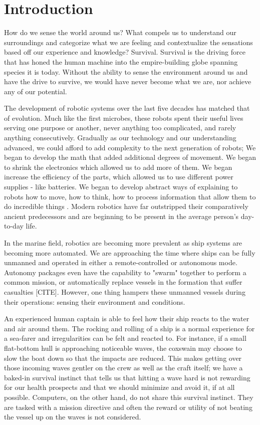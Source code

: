 \chapter{Introduction}\label{chap:intro}
How do we sense the world around us?
What compels us to understand our surroundings and categorize what we are feeling and contextualize the sensations based off our experience and knowledge?
Survival.
Survival is the driving force that has honed the human machine into the empire-building globe spanning species it is today.
Without the ability to sense the environment around us and have the drive to survive, we would have never become what we are, nor achieve any of our potential.

The development of robotic systems over the last five decades has matched that of evolution.
Much like the first microbes, these robots spent their useful lives serving one purpose or another, never anything too complicated, and rarely anything consecutively.
Gradually as our technology and our understanding advanced, we could afford to add complexity to the next generation of robots;
We began to develop the math that added additional degrees of movement.
We began to shrink the electronics which allowed us to add more of them.
We began increase the efficiency of the parts, which allowed us to use different power supplies - like batteries.
We began to develop abstract ways of explaining to robots how to move, how to think, how to process information that allow them to do incredible things .
Modern robotics have far outstripped their comparatively ancient predecessors and are beginning to be present in the average person's day-to-day life.

In the marine field, robotics are becoming more prevalent as ship systems are becoming more automated.
We are approaching the time where ships can be fully unmanned and operated in either a remote-controlled or autonomous mode.
Autonomy packages even have the capability to "swarm" together to perform a common mission, or automatically replace vessels in the formation that suffer casualties [CITE].
However, one thing hampers these unmanned vessels during their operations: sensing their environment and conditions.

An experienced human captain is able to feel how their ship reacts to the water and air around them. 
The rocking and rolling of a ship is a normal experience for a sea-farer and irregularities can be felt and reacted to.
For instance, if a small flat-bottom hull is approaching noticeable waves, the coxswain may choose to slow the boat down so that the impacts are reduced.
This makes getting over those incoming waves gentler on the crew as well as the craft itself; we have a baked-in survival instinct that tells us that hitting a wave hard is not rewarding for our health prospects and that we should minimize and avoid it, if at all possible.
Computers, on the other hand, do not share this survival instinct.
They are tasked with a mission directive and often the reward or utility of not beating the vessel up on the waves is not considered.

